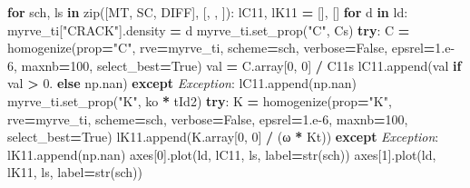 \documentclass[
  a4paper,
  numbers=noendperiod,
  DIV=12]{scrreprt}
\newenvironment{Shaded}{\begin{snugshade}}{\end{snugshade}}
\newcommand{\BuiltInTok}[1]{#1}
\newcommand{\ControlFlowTok}[1]{\textcolor[rgb]{0.13,0.29,0.53}{\textbf{#1}}}
\newcommand{\DecValTok}[1]{\textcolor[rgb]{0.00,0.00,0.81}{#1}}
\newcommand{\FloatTok}[1]{\textcolor[rgb]{0.00,0.00,0.81}{#1}}
\newcommand{\KeywordTok}[1]{\textcolor[rgb]{0.13,0.29,0.53}{\textbf{#1}}}
\newcommand{\NormalTok}[1]{#1}
\newcommand{\OperatorTok}[1]{\textcolor[rgb]{0.81,0.36,0.00}{\textbf{#1}}}
\newcommand{\PreprocessorTok}[1]{\textcolor[rgb]{0.56,0.35,0.01}{\textit{#1}}}
\newcommand{\StringTok}[1]{\textcolor[rgb]{0.31,0.60,0.02}{#1}}
\newcommand{\VariableTok}[1]{\textcolor[rgb]{0.00,0.00,0.00}{#1}}
\begin{document}
\begin{Shaded}
\begin{Highlighting}[]
\ControlFlowTok{for}\NormalTok{ sch, ls }\KeywordTok{in} \BuiltInTok{zip}\NormalTok{([MT, SC, DIFF], [}\StringTok{\textquotesingle{}{-}\textquotesingle{}}\NormalTok{, }\StringTok{\textquotesingle{}{-}\textquotesingle{}}\NormalTok{, }\StringTok{\textquotesingle{}{-}{-}\textquotesingle{}}\NormalTok{]):}
\NormalTok{    lC11, lK11 }\OperatorTok{=}\NormalTok{ [], []}
    \ControlFlowTok{for}\NormalTok{ d }\KeywordTok{in}\NormalTok{ ld:}
\NormalTok{        myrve\_ti[}\StringTok{"CRACK"}\NormalTok{].density }\OperatorTok{=}\NormalTok{ d}
\NormalTok{        myrve\_ti.set\_prop(}\StringTok{"C"}\NormalTok{, Cs)}
        \ControlFlowTok{try}\NormalTok{:}
\NormalTok{            C }\OperatorTok{=}\NormalTok{ homogenize(prop}\OperatorTok{=}\StringTok{"C"}\NormalTok{, rve}\OperatorTok{=}\NormalTok{myrve\_ti, scheme}\OperatorTok{=}\NormalTok{sch,}
\NormalTok{                           verbose}\OperatorTok{=}\VariableTok{False}\NormalTok{, epsrel}\OperatorTok{=}\FloatTok{1.e{-}6}\NormalTok{, maxnb}\OperatorTok{=}\DecValTok{100}\NormalTok{,}
\NormalTok{                           select\_best}\OperatorTok{=}\VariableTok{True}\NormalTok{)}
\NormalTok{            val }\OperatorTok{=}\NormalTok{ C.array[}\DecValTok{0}\NormalTok{, }\DecValTok{0}\NormalTok{] }\OperatorTok{/}\NormalTok{ C11s}
\NormalTok{            lC11.append(val }\ControlFlowTok{if}\NormalTok{ val }\OperatorTok{\textgreater{}} \FloatTok{0.} \ControlFlowTok{else}\NormalTok{ np.nan)}
        \ControlFlowTok{except} \PreprocessorTok{Exception}\NormalTok{:}
\NormalTok{            lC11.append(np.nan)}
\NormalTok{        myrve\_ti.set\_prop(}\StringTok{"K"}\NormalTok{, ko }\OperatorTok{*}\NormalTok{ tId2)}
        \ControlFlowTok{try}\NormalTok{:}
\NormalTok{            K }\OperatorTok{=}\NormalTok{ homogenize(prop}\OperatorTok{=}\StringTok{"K"}\NormalTok{, rve}\OperatorTok{=}\NormalTok{myrve\_ti, scheme}\OperatorTok{=}\NormalTok{sch,}
\NormalTok{                           verbose}\OperatorTok{=}\VariableTok{False}\NormalTok{, epsrel}\OperatorTok{=}\FloatTok{1.e{-}6}\NormalTok{, maxnb}\OperatorTok{=}\DecValTok{100}\NormalTok{,}
\NormalTok{                           select\_best}\OperatorTok{=}\VariableTok{True}\NormalTok{)}
\NormalTok{            lK11.append(K.array[}\DecValTok{0}\NormalTok{, }\DecValTok{0}\NormalTok{] }\OperatorTok{/}\NormalTok{ (ω }\OperatorTok{*}\NormalTok{ Kt))}
        \ControlFlowTok{except} \PreprocessorTok{Exception}\NormalTok{:}
\NormalTok{            lK11.append(np.nan)}
\NormalTok{    axes[}\DecValTok{0}\NormalTok{].plot(ld, lC11, ls, label}\OperatorTok{=}\BuiltInTok{str}\NormalTok{(sch))}
\NormalTok{    axes[}\DecValTok{1}\NormalTok{].plot(ld, lK11, ls, label}\OperatorTok{=}\BuiltInTok{str}\NormalTok{(sch))}


\end{Highlighting}
\end{Shaded}
\end{document}
